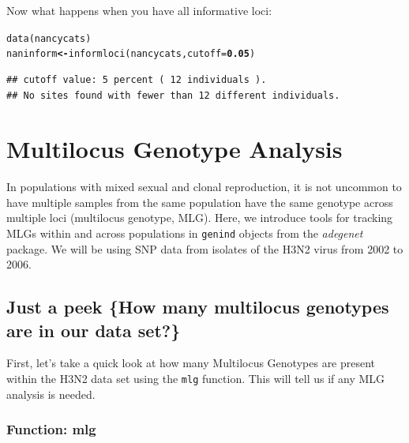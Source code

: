\documentclass[letterpaper]{article}\usepackage[]{graphicx}\usepackage[]{color}
\makeatletter
\newcommand{\hlnum}[1]{\textcolor[rgb]{0.502,0,0.502}{\textbf{#1}}}%
\newcommand{\hlstd}[1]{\textcolor[rgb]{0,0,0}{#1}}%
\newcommand{\hlkwb}[1]{\textcolor[rgb]{0.502,0.502,0.753}{\textbf{#1}}}%
\newcommand{\hlkwc}[1]{\textcolor[rgb]{0,0.502,0.753}{#1}}%
\newcommand{\hlkwd}[1]{\textcolor[rgb]{0,0.267,0.4}{#1}}%
\newenvironment{kframe}{%
 \def\at@end@of@kframe{}%
 \ifinner\ifhmode%
  \def\at@end@of@kframe{\end{minipage}}%
  \begin{minipage}{\columnwidth}%
 \fi\fi%
 \def\FrameCommand##1{\hskip\@totalleftmargin \hskip-\fboxsep
 \colorbox{shadecolor}{##1}\hskip-\fboxsep
     \hskip-\linewidth \hskip-\@totalleftmargin \hskip\columnwidth}%
 \MakeFramed {\advance\hsize-\width
   \@totalleftmargin\z@ \linewidth\hsize
   \@setminipage}}%
 {\par\unskip\endMakeFramed%
 \at@end@of@kframe}
\newenvironment{knitrout}{}{} %
\newcommand{\tab}{\hspace*{1em}}
\makeatother
\begin{document}
Now what happens when you have all informative loci:
\begin{knitrout}\footnotesize
{}\color{fgcolor}\begin{kframe}
\begin{alltt}
\hlkwd{data}\hlstd{(nancycats)}
\hlstd{naninform} \hlkwb{<-} \hlkwd{informloci}\hlstd{(nancycats,} \hlkwc{cutoff} \hlstd{=} \hlnum{0.05}\hlstd{)}
\end{alltt}
\begin{verbatim}
## cutoff value: 5 percent ( 12 individuals ).
## No sites found with fewer than 12 different individuals.
\end{verbatim}
\end{kframe}
\end{knitrout}


\section{Multilocus Genotype Analysis}\label{mlg}

\tab\tab In populations with mixed sexual and clonal reproduction, it is not uncommon to have multiple samples from the same population have the same genotype across multiple loci (multilocus genotype, MLG). Here, we introduce tools for tracking MLGs within and across populations in \texttt{genind} objects from the \textit{adegenet} package. We will be using SNP data from isolates of the H3N2 virus from 2002 to 2006.
\subsection{Just a peek \{How many multilocus genotypes are in our data set?\}}\label{mlg:mlg}

\tab\tab First, let's take a quick look at how many Multilocus Genotypes are present within the H3N2 data set using the \texttt{mlg} function. This will tell us if any MLG analysis is needed.
\subsubsection{Function: mlg}\label{mlg:mlg:mlg}
\end{document}
